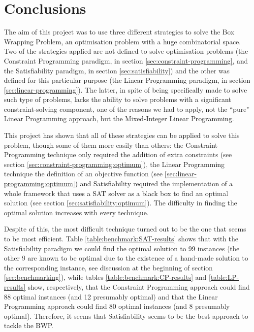 \section{Conclusions}
\label{sec:conclusions}

The aim of this project was to use three different strategies to solve the Box Wrapping
Problem, an optimisation problem with a huge combinatorial space. Two of the
strategies applied are not defined to solve optimisation problems (the Constraint
Programming paradigm, in section \ref{sec:constraint-programming}, and the
Satisfiability paradigm, in section \ref{sec:satisfiability}) and the other
was defined for this particular purpose (the Linear Programming paradigm, in
section \ref{sec:linear-programming}). The latter, in spite of being specifically
made to solve such type of problems, lacks the ability to solve problems with
a significant constraint-solving component, one of the reasons we had to apply,
not the ``pure'' Linear Programming approach, but the Mixed-Integer Linear Programming.

\hfill

This project has shown that all of these strategies can be applied to solve this problem,
though some of them more easily than others: the Constraint Programming technique only
required the addition of extra constraints (see section \ref{sec:constraint-programming:optimum}),
the Linear Programming technique the definition of an objective function (see
\ref{sec:linear-programming:optimum}) and Satisfiability required the implementation of a
whole framework that uses a SAT solver as a black box to find an optimal solution (see section
\ref{sec:satisfiability:optimum}). The difficulty in finding the optimal solution increases
with every technique.

\hfill

Despite of this, the most difficult technique turned out to be the one that seems to be most
efficient. Table \ref{table:benchmark:SAT-results} shows that with the Satisfiability
paradigm we could find the optimal solution to 99 instances (the other 9 are known
to be optimal due to the existence of a hand-made solution to the corresponding
instance, see discussion at the beginning of section \ref{sec:benchmarking}), while tables
\ref{table:benchmark:CP-results} and \ref{table:LP-results} show, respectively, that
the Constraint Programming approach could find 88 optimal instances (and 12 presumably
optimal) and that the Linear Programming approach could find 80 optimal instances (and
8 presumably optimal). Therefore, it seems that Satisfiability seems to be the best
approach to tackle the BWP.

